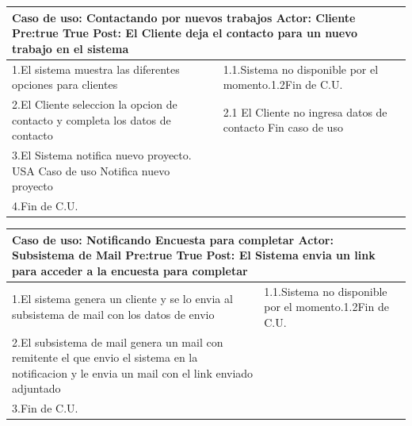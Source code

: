 \begin{longtable}{|p{}|p{}|}
    \hline
    \multicolumn{2}{|p{16cm}|}{
        \textbf{Caso de uso:} Contactando por nuevos trabajos\newline
        \textbf{Actor:} Cliente\newline
        \textbf{Pre:true }  True\newline
        \textbf{Post:} El Cliente deja el contacto para un nuevo trabajo en el sistema
    }\\
    \hline
    1.El sistema muestra las diferentes opciones para clientes & 1.1.Sistema no  disponible por el momento.\newline 1.2Fin de C.U.\\
    \hline
    2.El Cliente seleccion la opcion de contacto y completa los datos de contacto&2.1 El Cliente no ingresa datos de contacto\newline 2.2 Fin caso de uso   \\
    \hline
    3.El Sistema notifica nuevo proyecto. USA Caso de uso Notifica nuevo proyecto& \\
    \hline
    4.Fin de C.U.& \\
    \hline
\end{longtable}



\begin{longtable}{|p{}|p{}|}
    \hline
    \multicolumn{2}{|p{16cm}|}{
        \textbf{Caso de uso:} Notificando Encuesta para completar\newline
        \textbf{Actor:} Subsistema de Mail\newline
        \textbf{Pre:true }  True\newline
        \textbf{Post:} El Sistema envia un link para acceder a la encuesta para completar
    }\\
    \hline
    1.El sistema genera un cliente y se lo envia al subsistema de mail con los datos de envio & 1.1.Sistema no  disponible por el momento.\newline 1.2Fin de C.U.\\
    \hline
    2.El subsistema de mail genera un mail con remitente el que envio el sistema en la notificacion y le envia un mail con el link enviado adjuntado&   \\
    \hline
    3.Fin de C.U.& \\
    \hline
\end{longtable}


